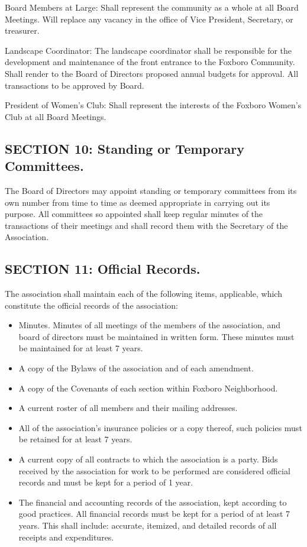 Board Members at Large: Shall represent the community as a whole at all
Board Meetings. Will replace any vacancy in the office of Vice President,
Secretary, or treasurer.

Landscape Coordinator: The landscape coordinator shall be responsible
for the development and maintenance of the front entrance to the Foxboro
Community. Shall render to the Board of Directors proposed annual budgets
for approval. All transactions to be approved by Board.

President of Women’s Club: Shall represent the interests of the Foxboro
Women’s Club at all Board Meetings.

\subsection{SECTION 10: Standing or Temporary Committees.}
The Board of Directors may appoint standing or temporary committees from
its own number from time to time as deemed appropriate in carrying out
its purpose. All committees so appointed shall keep regular minutes
of the transactions of their meetings and shall record them with the
Secretary of the Association.

\subsection{SECTION 11: Official Records.}
The association shall maintain each of the following items, applicable,
which constitute the official records of the association:

\begin{itemize}

\item Minutes. Minutes of all meetings of the members of the association,
and board of directors must be maintained in written form. These minutes
must be maintained for at least 7 years.

\item A copy of the Bylaws of the association and of each amendment.

\item A copy of the Covenants of each section within Foxboro Neighborhood.

\item A current roster of all members and their mailing addresses.

\item All of the association’s insurance policies or a copy thereof,
such policies must be retained for at least 7 years.

\item A current copy of all contracts to which the association is a
party. Bids received by the association for work to be performed are
considered official records and must be kept for a period of 1 year.

\item The financial and accounting records of the association, kept
according to good practices. All financial records must be kept for
a period of at least 7 years. This shall include: accurate, itemized,
and detailed records of all receipts and expenditures.

\end{itemize}

